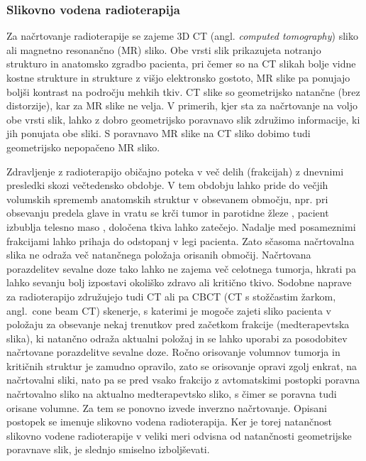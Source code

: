 \documentclass[a4paper,twoside,11pt]{article}
\begin{document}
	\subsubsection*{Slikovno vodena radioterapija}
	\par{
	  Za načrtovanje radioterapije se zajeme 3D CT (angl. \emph{computed tomography}) sliko ali magnetno resonančno (MR) sliko. Obe vrsti slik prikazujeta notranjo strukturo in anatomsko zgradbo pacienta, pri čemer so na CT slikah bolje vidne kostne strukture in strukture z višjo elektronsko gostoto, MR slike pa ponujajo boljši kontrast na področju mehkih tkiv. CT slike so geometrijsko natančne (brez distorzije), kar za MR slike ne velja. V primerih, kjer sta za načrtovanje na voljo obe vrsti slik, lahko z dobro geometrijsko poravnavo slik združimo informacije, ki jih ponujata obe sliki. S poravnavo MR slike na CT sliko dobimo tudi geometrijsko nepopačeno MR sliko.
	}
	\par{
	  Zdravljenje z radioterapijo običajno poteka v več delih (frakcijah) z dnevnimi presledki skozi večtedensko obdobje. V tem obdobju lahko pride do večjih volumskih sprememb anatomskih struktur v obsevanem območju, npr. pri obsevanju predela glave in vratu se krči tumor \cite{surucu2016} in parotidne žleze \cite{fiorentino2012}, pacient izbublja telesno maso \cite{ottosson2013}, določena tkiva lahko zatečejo. Nadalje med posameznimi frakcijami lahko prihaja do odstopanj v legi pacienta. Zato sčasoma načrtovalna slika ne odraža več natančnega položaja orisanih območij. Načrtovana porazdelitev sevalne doze tako lahko ne zajema več celotnega tumorja, hkrati pa lahko sevanju bolj izpostavi okoliško zdravo ali kritično tkivo. Sodobne naprave za radioterapijo združujejo tudi CT ali pa CBCT (CT s stožčastim žarkom, angl.~cone beam CT) skenerje, s katerimi je mogoče zajeti sliko pacienta v položaju za obsevanje nekaj trenutkov pred začetkom frakcije (medterapevtska slika), ki natančno odraža aktualni položaj in se lahko uporabi za posodobitev načrtovane porazdelitve sevalne doze. Ročno orisovanje volumnov tumorja in kritičnih struktur je zamudno opravilo, zato se orisovanje opravi zgolj enkrat, na načrtovalni sliki, nato pa se pred vsako frakcijo z avtomatskimi postopki poravna načrtovalno sliko na aktualno medterapevtsko sliko, s čimer se poravna tudi orisane volumne. Za tem se ponovno izvede inverzno načrtovanje. Opisani postopek se imenuje slikovno vodena radioterapija. Ker je torej natančnost slikovno vodene radioterapije v veliki meri odvisna od natančnosti geometrijske poravnave slik, je slednjo smiselno izboljševati.
	}
\end{document}
